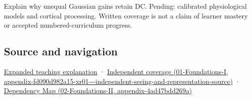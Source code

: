 Explain why unequal Gaussian gains retain DC. Pending: calibrated physiological models and cortical processing. Written coverage is not a claim of learner mastery or accepted numbered-curriculum progress.

\subsection{Source and navigation}\label{appendix-7281c15ac44a-source-and-navigation}

\hyperref[04-visual-computing-ii-ch042-the-eye-is-an-optical-instrument-with-neural-processing-inside-it]{Expanded teaching explanation} · \href{../01-Foundations-I/main.pdf\#nameddest=appendix-fd090d982a15-xr01---independent-seeing-and-representation-source}{Independent coverage (01-Foundations-I, appendix-fd090d982a15-xr01-\/-\/-independent-seeing-and-representation-source)} · \href{../02-Foundations-II/main.pdf\#nameddest=appendix-4ad47bdd269a}{Dependency Map (02-Foundations-II, appendix-4ad47bdd269a)}
